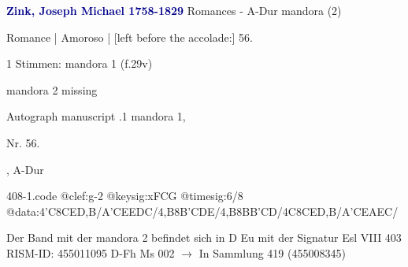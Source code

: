 \documentclass[twocolumn]{book}
\begin{document}
\newline \par \vspace{7pt} \textcolor{darkblue}{\textbf{Zink, Joseph Michael  1758-1829}}
\newline Romances - A-Dur
\newline mandora (2)
\newline \begin{itshape}[f.29v, at left:] Romance | Amoroso | [left before the accolade:] 56.\end{itshape} 
\newline \textcolor{darkblue}{}  1 Stimmen: mandora 1  (f.29v)
\newline \begin{small} mandora 2 missing\end{small} 
\newline Autograph manuscript
.1  mandora 1, \begin{itshape}Nr. 56.\end{itshape}, A-Dur  
\begin{filecontents*}{408-1.code}
@clef:g-2
@keysig:xFCG
@timesig:6/8
@data:4'C8CED,B/A'CEEDC/4,B8B'CDE/4,B8BB'CD/4C8CED,B/A'CEAEC/
\end{filecontents*}
\newline
%
\newline Der Band mit der mandora 2 befindet sich in D Eu mit der Signatur Esl VIII 403
\newline RISM-ID: 455011095
\newline D-Fh  Ms 002
\newline $\rightarrow$ In Sammlung 419 (455008345)
      
\end{document}
